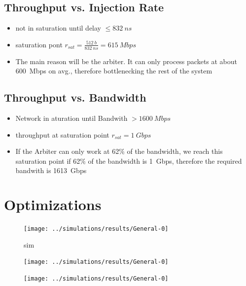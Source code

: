 \documentclass[]{scrartcl}
\begin{document}
    \subsection{Throughput vs. Injection Rate}
    \begin{itemize}
        \item not in saturation until delay $\leq \SI{832}{ns}$
        \item saturation pont $r_{sat} = \frac{\SI{512}{b}}{\SI{832}{ns}} = \SI{615}{Mbps}$
        \item The main reason will be the arbiter. It can only process packets at about \SI{600}{Mbps} on avg., therefore bottlenecking the rest of the system
    \end{itemize}
    \subsection{Throughput vs. Bandwidth}
    \begin{itemize}
        \item Network in aturation until Bandwith $> \SI{1600}{Mbps}$
        \item throughput at saturation point $r_{sat} = \SI{1}{Gbps}$
        \item If the Arbiter can only work at 62\% of the bandwidth, we reach this saturation point if 62\% of the bandwidth is \SI{1}{Gbps}, therefore the required bandwith is \SI{1613}{Gbps}
    \end{itemize}
\section{Optimizations}

\begin{figure}[ht]
    \centering
    \texttt{[image: ../simulations/results/General-0]}
    \caption{sim}%
    \label{fig:optsim_inport_qlen}
\end{figure}
\begin{figure}[ht]
    \centering
    \texttt{[image: ../simulations/results/General-0]}
    \caption{}%
    \label{fig:}
\end{figure}
\begin{figure}[ht]
    \centering
    \texttt{[image: ../simulations/results/General-0]}
    \caption{}%
    \label{fig:}
\end{figure}
\end{document}
